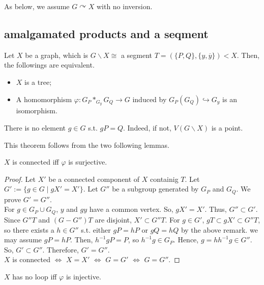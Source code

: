  As below, we assume $G \curvearrowright X$ with no inversion.

\subsection{amalgamated products and a seqment} 
 
\begin{theorem}
  Let $X$ be a graph, which is $G \backslash X \cong$ a segment $T=(\{P,Q\}, \{y,\overline{y}\}) < X$.
  Then, the followings are equivalent.
  \begin{itemize}
    \item $X$ is a tree;
    \item A homomorphism $\varphi : G_P *_{G_y}G_Q \rightarrow G$ induced by $G_P (G_Q) \hookrightarrow G_y$ is an isomorphism.
  \end{itemize}  
\end{theorem}

\begin{remark}
  There is no element $g \in G$ s.t. $g P = Q$.
  Indeed, if not, $V(G\backslash X)$ is a point.
\end{remark}

This theorem follows from the two following lemmas.

\begin{lemma}
  $X$ is connected iff $\varphi$ is surjective.
\end{lemma}

\begin{proof}
  Let $X'$ be a connected component of $X$ containig $T$.
  Let $G' := \{ g \in G \;|\; g X' = X'\}$.
  Let $G''$ be a subgroup generated by $G_P$ and $G_Q$.
  We prove $G' = G''$.\\
  For $ g \in G_P \cup G_Q$, $y$ and $gy$ have a common vertex.
  So, $g X' = X'$.
  Thus, $G'' \subset G'$.\\
  Since $G''T$ and $(G-G'')T$ are disjoint, $X' \subset G''T$.
  For $g \in G'$, $gT \subset gX' \subset G''T$,
  so there exists a $h \in G''$ s.t. either $gP=hP$ or $gQ =hQ$ by the above remark.
  we may assume $gP = hP$.
  Then, $h^{-1}g P = P$, so $h^{-1}g \in G_P$.
  Hence, $g = h h^{-1} g \in G''$.
  So, $G' \subset G''$.
  Therefore, $G' = G''$. \\
  $X$ is connected $\Leftrightarrow$ $X = X'$ $\Leftrightarrow$ $G = G'$ $\Leftrightarrow$ $G = G''$.  
\end{proof}

\begin{lemma}
  $X$ has no loop iff $\varphi$ is injective.
\end{lemma}

